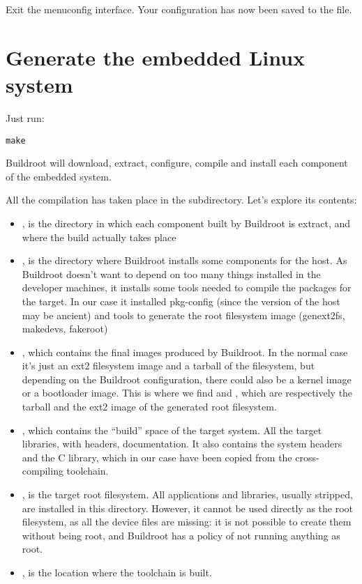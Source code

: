 Exit the menuconfig interface. Your configuration has now been saved
to the  file.

\clearpage
\section{Generate the embedded Linux system}

Just run:

\begin{verbatim}
make
\end{verbatim}

Buildroot will download, extract, configure, compile and install each
component of the embedded system.

All the compilation has taken place in the  subdirectory. Let's
explore its contents:

\begin{itemize}

\item {}, is the directory in which each component built by
  Buildroot is extract, and where the build actually takes place

\item {}, is the directory where Buildroot installs some
  components for the host. As Buildroot doesn't want to depend on too
  many things installed in the developer machines, it installs some
  tools needed to compile the packages for the target. In our case it
  installed pkg-config (since the version of the host may be ancient)
  and tools to generate the root filesystem image (genext2fs,
  makedevs, fakeroot)

\item {}, which contains the final images produced by
  Buildroot. In the normal case it's just an ext2 filesystem image and a
  tarball of the filesystem, but depending on the Buildroot
  configuration, there could also be a kernel image or a bootloader
  image. This is where we find  and
  , which are respectively the tarball and the ext2
  image of the generated root filesystem.

\item {}, which contains the “build” space of the target
  system. All the target libraries, with headers, documentation. It
  also contains the system headers and the C library, which in our
  case have been copied from the cross-compiling toolchain.

\item {}, is the target root filesystem. All applications
  and libraries, usually stripped, are installed in this
  directory. However, it cannot be used directly as the root
  filesystem, as all the device files are missing: it is not possible
  to create them without being root, and Buildroot has a policy of not
  running anything as root.

\item {}, is the location where the toolchain is
  built.

\end{itemize}

